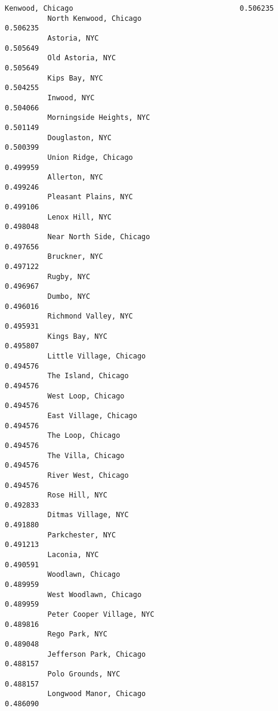\documentclass[11pt]{article}
\begin{document}
\begin{Verbatim}[commandchars=\\\{\}]
          Kenwood, Chicago                                       0.506235
          North Kenwood, Chicago                                 0.506235
          Astoria, NYC                                           0.505649
          Old Astoria, NYC                                       0.505649
          Kips Bay, NYC                                          0.504255
          Inwood, NYC                                            0.504066
          Morningside Heights, NYC                               0.501149
          Douglaston, NYC                                        0.500399
          Union Ridge, Chicago                                   0.499959
          Allerton, NYC                                          0.499246
          Pleasant Plains, NYC                                   0.499106
          Lenox Hill, NYC                                        0.498048
          Near North Side, Chicago                               0.497656
          Bruckner, NYC                                          0.497122
          Rugby, NYC                                             0.496967
          Dumbo, NYC                                             0.496016
          Richmond Valley, NYC                                   0.495931
          Kings Bay, NYC                                         0.495807
          Little Village, Chicago                                0.494576
          The Island, Chicago                                    0.494576
          West Loop, Chicago                                     0.494576
          East Village, Chicago                                  0.494576
          The Loop, Chicago                                      0.494576
          The Villa, Chicago                                     0.494576
          River West, Chicago                                    0.494576
          Rose Hill, NYC                                         0.492833
          Ditmas Village, NYC                                    0.491880
          Parkchester, NYC                                       0.491213
          Laconia, NYC                                           0.490591
          Woodlawn, Chicago                                      0.489959
          West Woodlawn, Chicago                                 0.489959
          Peter Cooper Village, NYC                              0.489816
          Rego Park, NYC                                         0.489048
          Jefferson Park, Chicago                                0.488157
          Polo Grounds, NYC                                      0.488157
          Longwood Manor, Chicago                                0.486090

\end{Verbatim}
\end{document}
